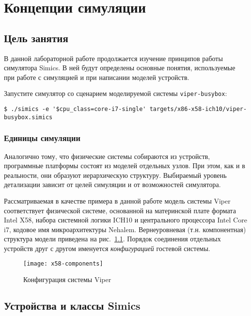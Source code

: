 \chapter{Концепции симуляции}\label{chap:lab02}

\section{Цель занятия}

В данной лабораторной работе продолжается изучение принципов работы симулятора Simics. В ней будут определены основные понятия, используемые при работе с симуляцией и при написании моделей устройств.

Запустите симулятор со сценарием моделируемой системы \texttt{viper-busybox}:

\begin{lstlisting}
$ ./simics -e '$cpu_class=core-i7-single' targets/x86-x58-ich10/viper-busybox.simics
\end{lstlisting}

\subsection{Единицы симуляции} 

Аналогично тому, что физические системы собираются из устройств, программные платформы состоят из моделей отдельных узлов. При этом, как и в реальности, они образуют иерархическую структуру. Выбираемый уровень детализации зависит от целей симуляции и от возможностей симулятора. 

Рассматриваемая в качестве примера в данной работе модель системы Viper~\cite{x58-target-guide} соответствует физической системе, основанной на материнской плате формата Intel X58, набора системной логики ICH10 и центрального процессора Intel Core i7, кодовое имя микроархитектуры Nehalem. Вернеуровневая (т.н. компонентная) структура модели приведена на рис.~\ref{fig:x58-components}. Порядок соединения отдельных устройств друг с другом именуется \textit{конфигурацией} гостевой системы.

\begin{figure}[htb]
    \centering
    \texttt{[image: x58-components]}
    \caption{Конфигурация системы Viper}
    \label{fig:x58-components}
\end{figure}


\section{Устройства и классы Simics}

